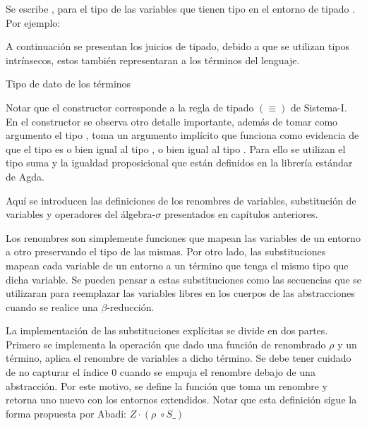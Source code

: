 \documentclass[]{report}
\begin{document}
	Se escribe \AgdaBound{$\Gamma$} \AgdaInductiveConstructor{$\ni$} , para el tipo de las variables que tienen tipo  en el entorno de tipado \AgdaBound{$\Gamma$}.
	Por ejemplo: 
	
	
	A continuación se presentan los juicios de tipado, debido a que se utilizan tipos intrínsecos, estos también representaran a los términos del lenguaje.
	
	\begin{codigo}
		Tipo de dato de los términos
		
	\end{codigo}
	
	Notar que el constructor \AgdaInductiveConstructor{$[\_]\equiv\_$} corresponde a la regla de tipado $(\equiv)$ de Sistema-I.
	En el constructor \AgdaInductiveConstructor{$\pi$} se observa otro detalle importante, además de tomar como argumento el tipo , toma un argumento implícito que funciona como evidencia de que el tipo  es o bien igual al tipo , o bien igual al tipo .
	Para ello se utilizan el tipo suma y la igualdad proposicional que están definidos en la librería estándar de Agda.
	
	
	Aquí se introducen las definiciones de los renombres de variables, substitución de variables y operadores del álgebra-$\sigma$ presentados en capítulos anteriores.
	
	
	Los renombres son simplemente funciones que mapean las variables de un entorno a otro preservando el tipo de las mismas.
	Por otro lado, las substituciones mapean cada variable de un entorno a un término que tenga el mismo tipo que dicha variable.
	Se pueden pensar a estas substituciones como las secuencias que se utilizaran para reemplazar las variables libres en los cuerpos de las abstracciones cuando se realice una $\beta$-reducción. 
	
	La implementación de las substituciones explícitas se divide en dos partes.
	Primero se implementa la operación  que dado una función de renombrado $\rho$ y un término, aplica el renombre de variables a dicho término.
	Se debe tener cuidado de no capturar el índice 0 cuando se empuja el renombre debajo de una abstracción.
	Por este motivo, se define la función  que toma un renombre y retorna uno nuevo con los entornos extendidos.
	Notar que esta definición sigue la forma propuesta por Abadi: $Z \cdot (\rho \; \circ S\_)$
	
\end{document}
